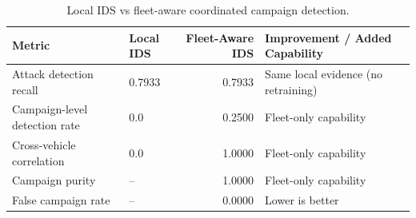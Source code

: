 \begin{table}[t]
\centering
\begin{tabular}{llrl}
\toprule
Metric & Local IDS & Fleet-Aware IDS & Improvement / Added Capability \\
\midrule
Attack detection recall & 0.7933 & 0.7933 & Same local evidence (no retraining) \\
Campaign-level detection rate & 0.0 & 0.2500 & Fleet-only capability \\
Cross-vehicle correlation & 0.0 & 1.0000 & Fleet-only capability \\
Campaign purity & -- & 1.0000 & Fleet-only capability \\
False campaign rate & -- & 0.0000 & Lower is better \\
\bottomrule
\end{tabular}
\caption{Local IDS vs fleet-aware coordinated campaign detection.}
\label{tab:local-vs-fleet-campaign}
\end{table}
